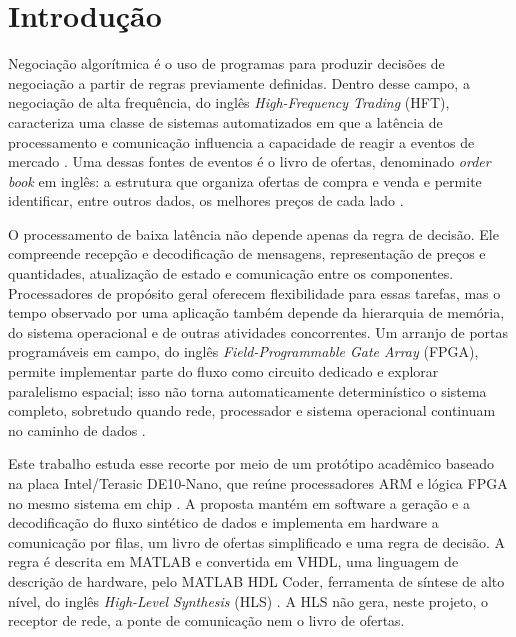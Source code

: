 
\chapter{Introdução}\label{cap:introducao}

Negociação algorítmica é o uso de programas para produzir decisões de negociação a partir de regras previamente definidas. Dentro desse campo, a negociação de alta frequência, do inglês \textit{High-Frequency Trading} (HFT), caracteriza uma classe de sistemas automatizados em que a latência de processamento e comunicação influencia a capacidade de reagir a eventos de mercado \cite{Aldridge2013,HasbrouckSaar2013}. Uma dessas fontes de eventos é o livro de ofertas, denominado \textit{order book} em inglês: a estrutura que organiza ofertas de compra e venda e permite identificar, entre outros dados, os melhores preços de cada lado \cite{Gould2013}.

O processamento de baixa latência não depende apenas da regra de decisão. Ele compreende recepção e decodificação de mensagens, representação de preços e quantidades, atualização de estado e comunicação entre os componentes. Processadores de propósito geral oferecem flexibilidade para essas tarefas, mas o tempo observado por uma aplicação também depende da hierarquia de memória, do sistema operacional e de outras atividades concorrentes. Um arranjo de portas programáveis em campo, do inglês \textit{Field-Programmable Gate Array} (FPGA), permite implementar parte do fluxo como circuito dedicado e explorar paralelismo espacial; isso não torna automaticamente determinístico o sistema completo, sobretudo quando rede, processador e sistema operacional continuam no caminho de dados \cite{PattersonHennessy2017,HarrisHarris2013}.

Este trabalho estuda esse recorte por meio de um protótipo acadêmico baseado na placa Intel/Terasic DE10-Nano, que reúne processadores ARM e lógica FPGA no mesmo sistema em chip \cite{TerasicDE10Nano,IntelCycloneV}. A proposta mantém em software a geração e a decodificação do fluxo sintético de dados e implementa em hardware a comunicação por filas, um livro de ofertas simplificado e uma regra de decisão. A regra é descrita em MATLAB e convertida em VHDL, uma linguagem de descrição de hardware, pelo MATLAB HDL Coder, ferramenta de síntese de alto nível, do inglês \textit{High-Level Synthesis} (HLS) \cite{MathWorksHDLCoder}. A HLS não gera, neste projeto, o receptor de rede, a ponte de comunicação nem o livro de ofertas.

